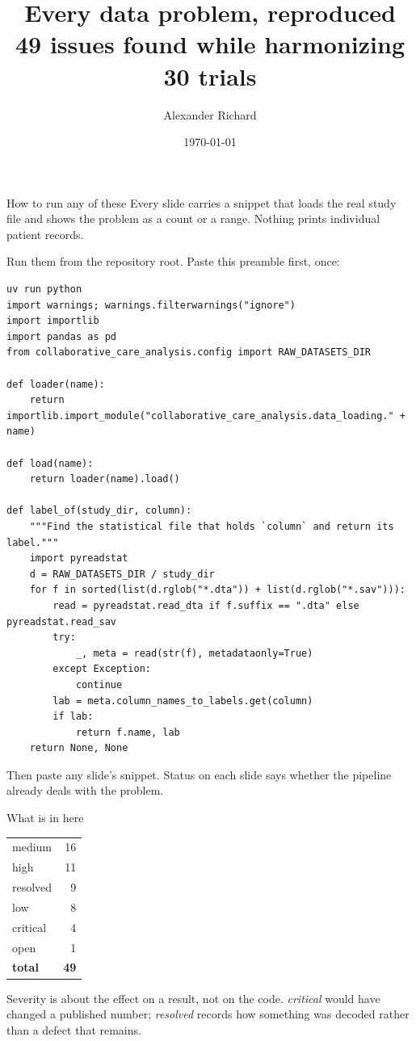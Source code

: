\documentclass[9pt, t, handout]{beamer}
\title{Every data problem, reproduced \\ \large 49 issues found while harmonizing 30 trials}
\author{Alexander Richard}
\institute{DSSGx Munich, Collaborative Care IPD}
\date{\today}
\newcommand{\ans}[1]{\textcolor{structure.fg}{#1}}
\begin{document}
\begin{frame}\titlepage\end{frame}

\begin{frame}[fragile]{How to run any of these}
  Every slide carries a snippet that loads the real study file and shows the
  problem as a count or a range. Nothing prints individual patient records.
  \vspace{6pt}

  Run them from the repository root. Paste this preamble first, once:
  \vspace{4pt}
  \begin{Verbatim}[fontsize=\tiny, frame=single, framesep=3pt]
uv run python
import warnings; warnings.filterwarnings("ignore")
import importlib
import pandas as pd
from collaborative_care_analysis.config import RAW_DATASETS_DIR

def loader(name):
    return importlib.import_module("collaborative_care_analysis.data_loading." + name)

def load(name):
    return loader(name).load()

def label_of(study_dir, column):
    """Find the statistical file that holds `column` and return its label."""
    import pyreadstat
    d = RAW_DATASETS_DIR / study_dir
    for f in sorted(list(d.rglob("*.dta")) + list(d.rglob("*.sav"))):
        read = pyreadstat.read_dta if f.suffix == ".dta" else pyreadstat.read_sav
        try:
            _, meta = read(str(f), metadataonly=True)
        except Exception:
            continue
        lab = meta.column_names_to_labels.get(column)
        if lab:
            return f.name, lab
    return None, None
  \end{Verbatim}
  \vspace{4pt}
  {\footnotesize Then paste any slide's snippet. \ans{Status} on each slide says
   whether the pipeline already deals with the problem.}
\end{frame}

\begin{frame}{What is in here}
  \begin{center}\footnotesize
  \begin{tabular}{lr}
    \toprule
    medium & 16 \\
    high & 11 \\
    resolved & 9 \\
    low & 8 \\
    critical & 4 \\
    open & 1 \\
    \midrule
    \textbf{total} & \textbf{49} \\
    \bottomrule
  \end{tabular}
  \end{center}
  \vspace{8pt}
  {\footnotesize \ans{Severity is about the effect on a result, not on the code.}
   \emph{critical} would have changed a published number; \emph{resolved} records
   how something was decoded rather than a defect that remains.}
\end{frame}
\end{document}
